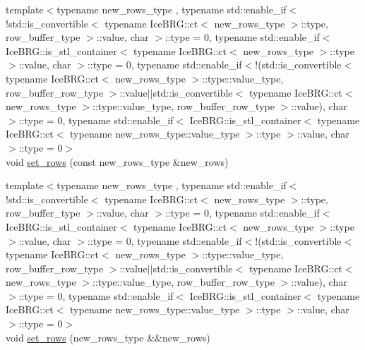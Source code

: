 \begin{DoxyCompactItemize}
\item 
{\footnotesize template$<$typename new\+\_\+rows\+\_\+type , typename std\+::enable\+\_\+if$<$!std\+::is\+\_\+convertible$<$ typename Ice\+B\+R\+G\+::ct$<$ new\+\_\+rows\+\_\+type $>$\+::type, row\+\_\+buffer\+\_\+type $>$\+::value, char $>$\+::type  = 0, typename std\+::enable\+\_\+if$<$ Ice\+B\+R\+G\+::is\+\_\+stl\+\_\+container$<$ typename Ice\+B\+R\+G\+::ct$<$ new\+\_\+rows\+\_\+type $>$\+::type $>$\+::value, char $>$\+::type  = 0, typename std\+::enable\+\_\+if$<$!(std\+::is\+\_\+convertible$<$ typename Ice\+B\+R\+G\+::ct$<$ new\+\_\+rows\+\_\+type $>$\+::type\+::value\+\_\+type, row\+\_\+buffer\+\_\+row\+\_\+type $>$\+::value$\vert$$\vert$std\+::is\+\_\+convertible$<$ typename Ice\+B\+R\+G\+::ct$<$ new\+\_\+rows\+\_\+type $>$\+::type\+::value\+\_\+type, row\+\_\+buffer\+\_\+row\+\_\+type $>$\+::value), char $>$\+::type  = 0, typename std\+::enable\+\_\+if$<$ Ice\+B\+R\+G\+::is\+\_\+stl\+\_\+container$<$ typename Ice\+B\+R\+G\+::ct$<$ typename new\+\_\+rows\+\_\+type\+::value\+\_\+type $>$\+::type $>$\+::value, char $>$\+::type  = 0$>$ }\\void \hyperlink{classIceBRG_1_1labeled__array_a9a0d7fd5a61c17cbfe63da474a3c1fc4}{set\+\_\+rows} (const new\+\_\+rows\+\_\+type \&new\+\_\+rows)
\item 
{\footnotesize template$<$typename new\+\_\+rows\+\_\+type , typename std\+::enable\+\_\+if$<$!std\+::is\+\_\+convertible$<$ typename Ice\+B\+R\+G\+::ct$<$ new\+\_\+rows\+\_\+type $>$\+::type, row\+\_\+buffer\+\_\+type $>$\+::value, char $>$\+::type  = 0, typename std\+::enable\+\_\+if$<$ Ice\+B\+R\+G\+::is\+\_\+stl\+\_\+container$<$ typename Ice\+B\+R\+G\+::ct$<$ new\+\_\+rows\+\_\+type $>$\+::type $>$\+::value, char $>$\+::type  = 0, typename std\+::enable\+\_\+if$<$!(std\+::is\+\_\+convertible$<$ typename Ice\+B\+R\+G\+::ct$<$ new\+\_\+rows\+\_\+type $>$\+::type\+::value\+\_\+type, row\+\_\+buffer\+\_\+row\+\_\+type $>$\+::value$\vert$$\vert$std\+::is\+\_\+convertible$<$ typename Ice\+B\+R\+G\+::ct$<$ new\+\_\+rows\+\_\+type $>$\+::type\+::value\+\_\+type, row\+\_\+buffer\+\_\+row\+\_\+type $>$\+::value), char $>$\+::type  = 0, typename std\+::enable\+\_\+if$<$ Ice\+B\+R\+G\+::is\+\_\+stl\+\_\+container$<$ typename Ice\+B\+R\+G\+::ct$<$ typename new\+\_\+rows\+\_\+type\+::value\+\_\+type $>$\+::type $>$\+::value, char $>$\+::type  = 0$>$ }\\void \hyperlink{classIceBRG_1_1labeled__array_ace0dc5458cbb2a6f1b9f5ce10734e90d}{set\+\_\+rows} (new\+\_\+rows\+\_\+type \&\&new\+\_\+rows)
\item 

\end{DoxyCompactItemize}
